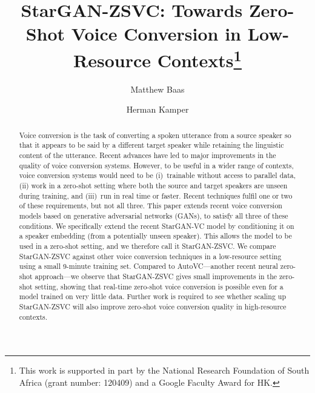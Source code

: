 \documentclass[runningheads]{llncs}
\begin{document}
%
\title{StarGAN-ZSVC: Towards Zero-Shot Voice Conversion in Low-Resource Contexts\thanks{This work is supported in part by the National Research Foundation of South Africa (grant number: 120409) and a Google Faculty Award for HK.}}
%
\author{Matthew Baas \and
Herman Kamper}
%


\maketitle  

\begin{abstract}
Voice conversion is the task of converting a spoken utterance from a source speaker so that it appears to be said by a different target speaker while retaining the linguistic content of the utterance. Recent advances have led to major improvements in the quality of voice conversion systems. 
However, to be useful in a wider range of contexts, voice conversion systems would need to be (i)~trainable without access to parallel data, (ii) work in a zero-shot setting where both the source and target speakers are unseen during training, and (iii)~run in real time or faster. Recent techniques fulfil one or two of these requirements, but not all three. This paper extends recent voice conversion models based on generative adversarial networks (GANs), to satisfy all three of these conditions. We specifically extend the recent StarGAN-VC model by conditioning it on a speaker embedding (from a potentially unseen speaker). This allows the model to be used in a zero-shot setting, and we therefore call it StarGAN-ZSVC. We compare StarGAN-ZSVC against other voice conversion techniques in a low-resource setting using a small 9-minute training set.
Compared to AutoVC---another recent neural zero-shot approach---we observe that StarGAN-ZSVC gives small improvements in the zero-shot setting, showing that real-time zero-shot voice conversion is possible even for a model trained on very little data. Further work is required to see whether scaling up StarGAN-ZSVC will also improve zero-shot voice conversion quality in high-resource contexts.

\end{abstract}
\end{document}

